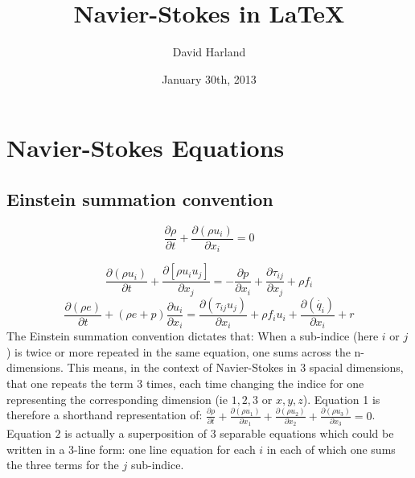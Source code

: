 \documentclass[12pt]{article}
\title{Navier-Stokes in \LaTeX{}}			%
\author{David Harland}		%
\date{January 30th, 2013}					%
\begin{document}
	\maketitle						%
	
	\section{Navier-Stokes Equations}
	
	\subsection{Einstein summation convention}
	
	\begin{equation}
		\frac{\partial \rho}{\partial t} + \frac{\partial(\rho u_{i})}{\partial x_{i}} = 0
	\end{equation}
	
	\begin{equation}
		\frac{\partial (\rho u_{i})}{\partial t} + \frac{\partial[\rho u_{i}u_{j}]}{\partial x_{j}} = -\frac{\partial p}{\partial x_{i}} + \frac{\partial \tau_{ij}}{\partial x_{j}} + \rho f_{i} \end{equation}
	\begin{equation}
		\frac{\partial (\rho e)}{\partial t} + (\rho e+p)\frac{\partial u_{i}}{\partial x_{i}} = \frac{\partial(\tau_{ij}u_{j})}{\partial x_{i}} + \rho f_{i}u_{i} + \frac{\partial(\dot{ q_{i}})}{\partial x_{i}} + r \end{equation}
	The Einstein summation convention dictates that: When a sub-indice (here $i$ or $j$) is twice or more repeated in the same equation, one sums across the n-dimensions. 
	This means, in the context of Navier-Stokes in 3 spacial dimensions, that one repeats the term 3 times, each time changing the indice for one representing the corresponding dimension (ie $1,2,3$ or $x,y,z$). Equation 1 is therefore a shorthand representation of: $\frac{\partial \rho}{\partial t}+\frac{\partial(\rho u_{1})}{\partial x_{1}}+\frac{\partial(\rho u_{2})}{\partial x_{2}}+ \frac{\partial(\rho u_{3})}{\partial x_{3}}=0$.
	Equation $2$ is actually a superposition of 3 separable equations which could be written in a 3-line form: one line equation for each $i$ in each of which one sums the three terms for the $j$ sub-indice.
\end{document}
